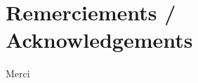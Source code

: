 \documentclass[../../Main_ManuscritThese.tex]{subfiles}
\begin{document}
\chapter*{Remerciements / Acknowledgements}
\TitleBtwLines
{}
{}
\pagestyle{empty}


Merci



\markchapterend
\end{document}

